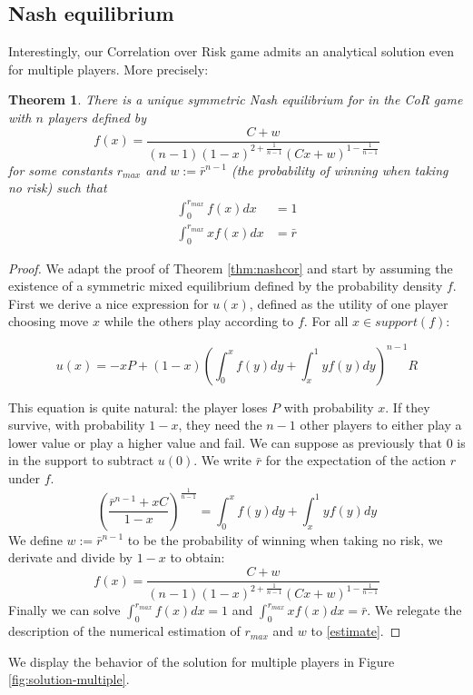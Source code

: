 \documentclass[preprint,12pt,authoryear]{elsarticle}
\newtheorem{theorem}{Theorem}[section]
\theoremstyle{definition}
\begin{document}
\subsection{Nash equilibrium}
Interestingly, our Correlation over Risk game admits an analytical solution even for multiple players. More precisely:
\begin{theorem}\label{thm:multiple}
    There is a unique symmetric Nash equilibrium for in the CoR game with $n$ players defined by $$f(x) = \frac{C + w}{(n-1)(1-x)^{2+\frac{1}{n-1}} (C x + w)^{1 - \frac{1}{n-1}}}$$
    for some constants $r_{max}$ and $w := \bar r ^ {n-1}$ (the probability of winning when taking no risk) such that 
    \begin{align*}
        \int_0^{r_{max}} f(x) dx &= 1 \\
        \int_0^{r_{max}} x f(x) dx &= \bar r 
    \end{align*}
\end{theorem} 
\begin{proof}
    
We adapt the proof of Theorem \ref{thm:nashcor} and start by assuming the existence of a symmetric mixed equilibrium defined by the probability density $f$. First we derive a nice expression for $u(x)$, defined as the utility of one player choosing move $x$ while the others play according to $f$. For all $x \in support(f)$:

$$u(x) = -x P + (1-x) \left( \int_0^x f(y) dy +\int_x^1 y f(y) dy \right)^{n-1} R$$

This equation is quite natural: the player loses $P$ with probability $x$. If they survive, with probability $1-x$, they need the $n-1$ other players to either play a lower value or play a higher value and fail. We can suppose as previously that $0$ is in the support to subtract $u(0)$. We write $\bar r$ for the expectation of the action $r$ under $f$.
$$\left(\frac{\bar r^{n-1} + x C}{1-x} \right)^\frac{1}{n-1} = \int_0^x f(y) dy + \int_x^1 y f(y) dy$$
We define $w := \bar r ^ {n-1}$ to be the probability of winning when taking no risk, we derivate and divide by $1-x$ to obtain:
$$f(x) = \frac{C + w}{(n-1)(1-x)^{2+\frac{1}{n-1}} (C x + w)^{1 - \frac{1}{n-1}}}$$
Finally we can solve $\int_0^{r_{max}} f(x) dx= 1$ and $\int_0^{r_{max}} x f(x) dx = \bar r$. We relegate the description of the numerical estimation of ${r_{max}}$ and $w$ to \ref{estimate}.
\end{proof}

We display the behavior of the solution for multiple players in Figure \ref{fig:solution-multiple}.
\end{document}
